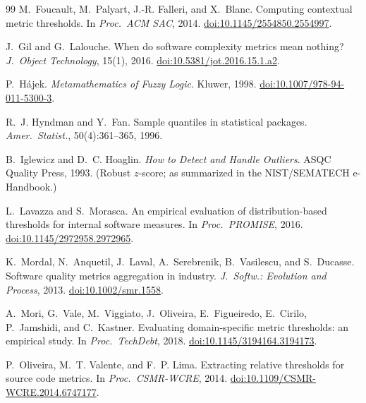 \documentclass[11pt]{article}
\theoremstyle{remark}
\begin{document}
\begin{thebibliography}{99}
M.~Foucault, M.~Palyart, J.-R. Falleri, and X.~Blanc.
\newblock Computing contextual metric thresholds.
\newblock In \emph{Proc.\ ACM SAC}, 2014.
\newblock \href{https://doi.org/10.1145/2554850.2554997}{doi:10.1145/2554850.2554997}.

J.~Gil and G.~Lalouche.
\newblock When do software complexity metrics mean nothing?
\newblock \emph{J.\ Object Technology}, 15(1), 2016.
\newblock \href{https://doi.org/10.5381/jot.2016.15.1.a2}{doi:10.5381/jot.2016.15.1.a2}.

P.~H{\'a}jek.
\newblock \emph{Metamathematics of Fuzzy Logic}.
\newblock Kluwer, 1998.
\newblock \href{https://doi.org/10.1007/978-94-011-5300-3}{doi:10.1007/978-94-011-5300-3}.

R.~J. Hyndman and Y.~Fan.
\newblock Sample quantiles in statistical packages.
\newblock \emph{Amer.\ Statist.}, 50(4):361--365, 1996.

B.~Iglewicz and D.~C. Hoaglin.
\newblock \emph{How to Detect and Handle Outliers}.
\newblock ASQC Quality Press, 1993.
\newblock (Robust $z$-score; as summarized in the NIST/SEMATECH e-Handbook.)

L.~Lavazza and S.~Morasca.
\newblock An empirical evaluation of distribution-based thresholds for
  internal software measures.
\newblock In \emph{Proc.\ PROMISE}, 2016.
\newblock \href{https://doi.org/10.1145/2972958.2972965}{doi:10.1145/2972958.2972965}.

K.~Mordal, N.~Anquetil, J.~Laval, A.~Serebrenik, B.~Vasilescu, and
  S.~Ducasse.
\newblock Software quality metrics aggregation in industry.
\newblock \emph{J.\ Softw.: Evolution and Process}, 2013.
\newblock \href{https://doi.org/10.1002/smr.1558}{doi:10.1002/smr.1558}.

A.~Mori, G.~Vale, M.~Viggiato, J.~Oliveira, E.~Figueiredo, E.~Cirilo,
  P.~Jamshidi, and C.~Kastner.
\newblock Evaluating domain-specific metric thresholds: an empirical study.
\newblock In \emph{Proc.\ TechDebt}, 2018.
\newblock \href{https://doi.org/10.1145/3194164.3194173}{doi:10.1145/3194164.3194173}.

P.~Oliveira, M.~T. Valente, and F.~P. Lima.
\newblock Extracting relative thresholds for source code metrics.
\newblock In \emph{Proc.\ CSMR-WCRE}, 2014.
\newblock \href{https://doi.org/10.1109/CSMR-WCRE.2014.6747177}{doi:10.1109/CSMR-WCRE.2014.6747177}.


\end{thebibliography}
\end{document}
